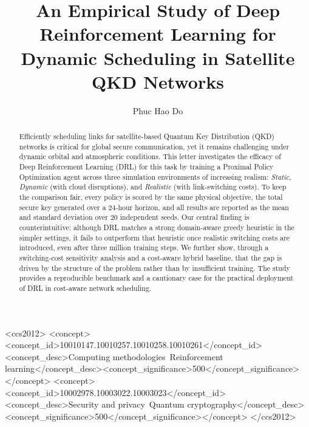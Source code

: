 \documentclass[manuscript, review, nonacm]{acmart}
\newcommand{\Nseed}{20}
\begin{document}
\title{An Empirical Study of Deep Reinforcement Learning for Dynamic Scheduling in Satellite QKD Networks}

\author{Phuc Hao Do}

\begin{abstract}
Efficiently scheduling links for satellite-based Quantum Key Distribution (QKD) networks is critical for global secure communication, yet it remains challenging under dynamic orbital and atmospheric conditions. This letter investigates the efficacy of Deep Reinforcement Learning (DRL) for this task by training a Proximal Policy Optimization agent across three simulation environments of increasing realism: \textit{Static}, \textit{Dynamic} (with cloud disruptions), and \textit{Realistic} (with link-switching costs). To keep the comparison fair, every policy is scored by the same physical objective, the total secure key generated over a 24-hour horizon, and all results are reported as the mean and standard deviation over \Nseed{} independent seeds. Our central finding is counterintuitive: although DRL matches a strong domain-aware greedy heuristic in the simpler settings, it fails to outperform that heuristic once realistic switching costs are introduced, even after three million training steps. We further show, through a switching-cost sensitivity analysis and a cost-aware hybrid baseline, that the gap is driven by the structure of the problem rather than by insufficient training. The study provides a reproducible benchmark and a cautionary case for the practical deployment of DRL in cost-aware network scheduling.
\end{abstract}

\begin{CCSXML}
<ccs2012>
   <concept><concept_id>10010147.10010257.10010258.10010261</concept_id><concept_desc>Computing methodologies~Reinforcement learning</concept_desc><concept_significance>500</concept_significance></concept>
   <concept><concept_id>10002978.10003022.10003023</concept_id><concept_desc>Security and privacy~Quantum cryptography</concept_desc><concept_significance>500</concept_significance></concept>
</ccs2012>
\end{CCSXML}
\end{document}
